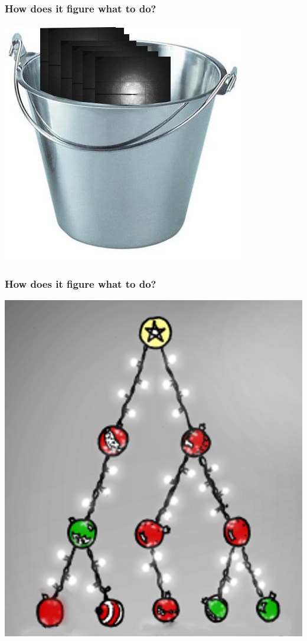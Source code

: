 \documentclass[slides,compress]{beamer}
\begin{document}
\begin{frame}
\frametitle{How does it figure what to do?}
\hspace{3cm}
\includegraphics[scale=0.4]{figures/bucket-of-images.jpg}
\end{frame}

\begin{frame}
\frametitle{How does it figure what to do?}
\hspace{4cm}
\includegraphics[scale=0.25]{figures/christmas-tree-nothing.png}
\end{frame}
\end{document}
